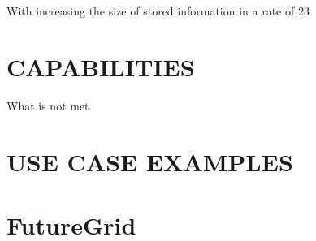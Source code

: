 \documentclass{sig-alternate}
\begin{document}
With increasing the size of stored information in a rate of 23%

\section{CAPABILITIES}

What is not met.

\section{USE CASE EXAMPLES}

\section{FutureGrid}
\end{document}
